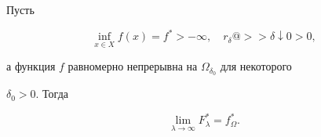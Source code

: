 \begin{lems}


Пусть


\begin{equation}\label{e3.3.13e}


\inf\limits_{x\in X}f(x) = f^{*} >


-\infty,\quad


r_{\delta}


@>>{\delta \downarrow 0}>0,


\end{equation}


а функция $f$ равномерно непрерывна на $\Omega_{\delta_0}$ для некоторого


$\delta_0 > 0$. Тогда


$$




\lim\limits_{\lambda \rightarrow \infty}F^{*}_{\lambda} =


f^{*}_{\Omega}.




$$


\end{lems}





